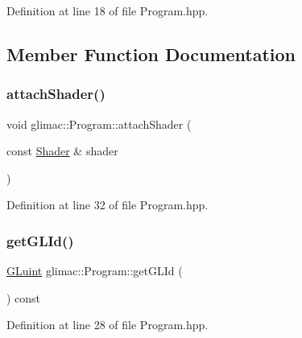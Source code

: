 Definition at line 18 of file Program.\+hpp.



\subsection{Member Function Documentation}
\mbox{\label{classglimac_1_1_program_a5aac165d28cd6f704c01a3e0eee2119d}} 
\subsubsection{\texorpdfstring{attach\+Shader()}{attachShader()}}
{\footnotesize\ttfamily void glimac\+::\+Program\+::attach\+Shader (\begin{DoxyParamCaption}\item[{const \hyperlink{classglimac_1_1_shader}{Shader} \&}]{shader }\end{DoxyParamCaption})\hspace{0.3cm}{\ttfamily [inline]}}



Definition at line 32 of file Program.\+hpp.

\mbox{\label{classglimac_1_1_program_ab1a519d005c77ba44876d1f309b38d18}} 
\subsubsection{\texorpdfstring{get\+G\+L\+Id()}{getGLId()}}
{\footnotesize\ttfamily \hyperlink{dummy_8cpp_aa311c7f0d6ec4f1a33f9235c3651b86b}{G\+Luint} glimac\+::\+Program\+::get\+G\+L\+Id (\begin{DoxyParamCaption}{ }\end{DoxyParamCaption}) const\hspace{0.3cm}{\ttfamily [inline]}}



Definition at line 28 of file Program.\+hpp.

\mbox{\label{classglimac_1_1_program_aaf1769457ca41bca4afad7ecf90e9c3f}} 
